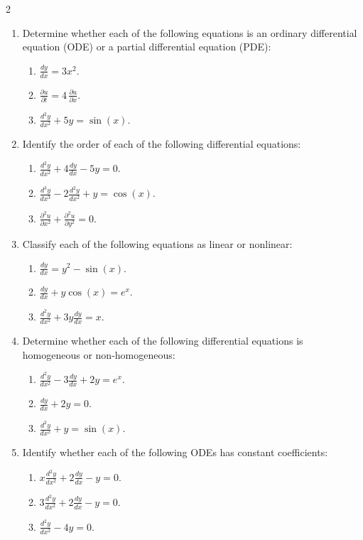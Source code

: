 \begin{multicols}{2}

\begin{enumerate}
    \item Determine whether each of the following equations is an ordinary differential equation (ODE) or a partial differential equation (PDE):
    \begin{enumerate}
        \item $ \frac{dy}{dx} = 3x^2. $
        \item $ \frac{\partial u}{\partial t} = 4\,\frac{\partial u}{\partial x}. $
        \item $ \frac{d^2y}{dx^2} + 5y = \sin(x). $
    \end{enumerate}

    \item Identify the order of each of the following differential equations:
    \begin{enumerate}
        \item $ \frac{d^2y}{dx^2} + 4\frac{dy}{dx} - 5y = 0. $
        \item $ \frac{d^3y}{dx^3} - 2\frac{d^2y}{dx^2} + y = \cos(x). $
        \item $ \frac{\partial^2 u}{\partial x^2} + \frac{\partial^2 u}{\partial y^2} = 0. $
    \end{enumerate}

    \item Classify each of the following equations as linear or nonlinear:
    \begin{enumerate}
        \item $ \frac{dy}{dx} = y^2 - \sin(x). $
        \item $ \frac{dy}{dx} + y\cos(x) = e^x. $
        \item $ \frac{d^2y}{dx^2} + 3y\frac{dy}{dx} = x. $
    \end{enumerate}

    \item Determine whether each of the following differential equations is homogeneous or non-homogeneous:
    \begin{enumerate}
        \item $ \frac{d^2y}{dx^2} - 3\frac{dy}{dx} + 2y = e^x. $
        \item $ \frac{dy}{dx} + 2y = 0. $
        \item $ \frac{d^2y}{dx^2} + y = \sin(x). $
    \end{enumerate}

    \item Identify whether each of the following ODEs has constant coefficients:
    \begin{enumerate}
        \item $ x\frac{d^2y}{dx^2} + 2\frac{dy}{dx} - y = 0. $
        \item $ 3\frac{d^2y}{dx^2} + 2\frac{dy}{dx} - y = 0. $
        \item $ \frac{d^2y}{dx^2} - 4y = 0. $
    \end{enumerate}


\end{enumerate}
\end{multicols}
